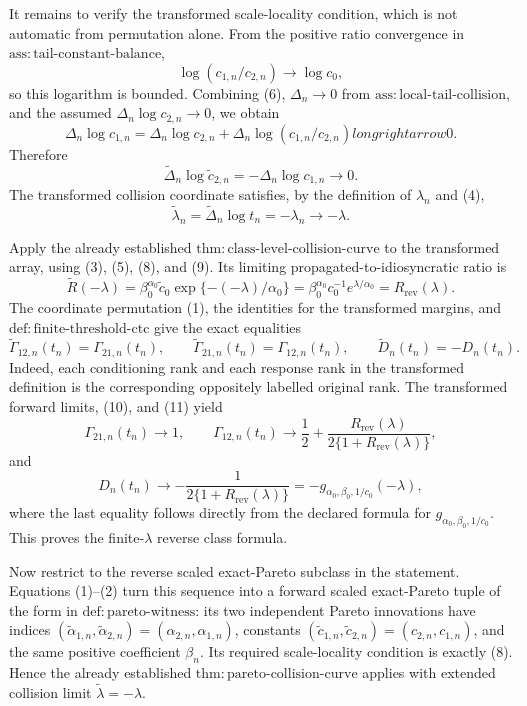 It remains to verify the transformed scale-locality condition, which is not automatic from permutation alone.  From the positive ratio convergence in \(\mathrm{ass{:}tail\text{-}constant\text{-}balance}\),
\[
\log(c_{1,n}/c_{2,n})\longrightarrow\log c_0,
\tag{6}
\]
so this logarithm is bounded.  Combining (6), \(\Delta_n\to0\) from \(\mathrm{ass{:}local\text{-}tail\text{-}collision}\), and the assumed \(\Delta_n\log c_{2,n}\to0\), we obtain
\[
\Delta_n\log c_{1,n}
=\Delta_n\log c_{2,n}
+\Delta_n\log(c_{1,n}/c_{2,n})longrightarrow0.
\tag{7}
\]
Therefore
\[
\widetilde\Delta_n\log\widetilde c_{2,n}
=-\Delta_n\log c_{1,n}\longrightarrow0.
\tag{8}
\]
The transformed collision coordinate satisfies, by the definition of \(\lambda_n\) and (4),
\[
\widetilde\lambda_n
=\widetilde\Delta_n\log t_n
=-\lambda_n\longrightarrow-\lambda.
\tag{9}
\]

Apply the already established \(\mathrm{thm{:}class\text{-}level\text{-}collision\text{-}curve}\) to the transformed array, using (3), (5), (8), and (9).  Its limiting propagated-to-idiosyncratic ratio is
\[
\widetilde R(-\lambda)
=\beta_0^{\alpha_0}\widetilde c_0
\exp\{-(-\lambda)/\alpha_0\}
=\beta_0^{\alpha_0}c_0^{-1}e^{\lambda/\alpha_0}
=R_{\mathrm{rev}}(\lambda).
\tag{10}
\]
The coordinate permutation (1), the identities for the transformed margins, and \(\mathrm{def{:}finite\text{-}threshold\text{-}ctc}\) give the exact equalities
\[
\widetilde\Gamma_{12,n}(t_n)=\Gamma_{21,n}(t_n),
\qquad
\widetilde\Gamma_{21,n}(t_n)=\Gamma_{12,n}(t_n),
\qquad
\widetilde D_n(t_n)=-D_n(t_n).
\tag{11}
\]
Indeed, each conditioning rank and each response rank in the transformed definition is the corresponding oppositely labelled original rank.  The transformed forward limits, (10), and (11) yield
\[
\Gamma_{21,n}(t_n)\to1,
\qquad
\Gamma_{12,n}(t_n)\to
\frac12+\frac{R_{\mathrm{rev}}(\lambda)}{2\{1+R_{\mathrm{rev}}(\lambda)\}},
\tag{12}
\]
and
\[
D_n(t_n)
\to-\frac1{2\{1+R_{\mathrm{rev}}(\lambda)\}}
=-g_{\alpha_0,\beta_0,1/c_0}(-\lambda),
\tag{13}
\]
where the last equality follows directly from the declared formula for \(g_{\alpha_0,\beta_0,1/c_0}\).  This proves the finite-\(\lambda\) reverse class formula.

Now restrict to the reverse scaled exact-Pareto subclass in the statement.  Equations (1)--(2) turn this sequence into a forward scaled exact-Pareto tuple of the form in \(\mathrm{def{:}pareto\text{-}witness}\): its two independent Pareto innovations have indices \((\widetilde\alpha_{1,n},\widetilde\alpha_{2,n})=(\alpha_{2,n},\alpha_{1,n})\), constants \((\widetilde c_{1,n},\widetilde c_{2,n})=(c_{2,n},c_{1,n})\), and the same positive coefficient \(\beta_n\).  Its required scale-locality condition is exactly (8).  Hence the already established \(\mathrm{thm{:}pareto\text{-}collision\text{-}curve}\) applies with extended collision limit \(\widetilde\lambda=-\lambda\).

